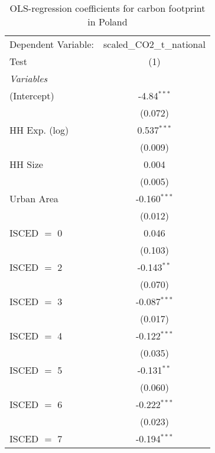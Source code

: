 
\begin{table}[htbp!]
   \centering
   \small
   \begin{adjustbox}{width = 1\textwidth, max height = 0.95\textheight, center}
      \begin{threeparttable}[b]
         \caption{\label{tab:OLS_2_POL} OLS-regression coefficients for carbon footprint in Poland}
         \begin{tabular}{lc}
            \tabularnewline \midrule \midrule
            Dependent Variable: & scaled\_CO2\_t\_national\\     
            Test                & (1)\\  
            \midrule
            \emph{Variables}\\
            (Intercept)         & -4.84$^{***}$\\   
                                & (0.072)\\   
            HH Exp. (log)       & 0.537$^{***}$\\   
                                & (0.009)\\   
            HH Size             & 0.004\\   
                                & (0.005)\\   
            Urban Area          & -0.160$^{***}$\\   
                                & (0.012)\\   
            ISCED $=$ 0         & 0.046\\   
                                & (0.103)\\   
            ISCED $=$ 2         & -0.143$^{**}$\\   
                                & (0.070)\\   
            ISCED $=$ 3         & -0.087$^{***}$\\   
                                & (0.017)\\   
            ISCED $=$ 4         & -0.122$^{***}$\\   
                                & (0.035)\\   
            ISCED $=$ 5         & -0.131$^{**}$\\   
                                & (0.060)\\   
            ISCED $=$ 6         & -0.222$^{***}$\\   
                                & (0.023)\\   
            ISCED $=$ 7         & -0.194$^{***}$\\   

\end{tabular}
\end{threeparttable}
\end{adjustbox}
\end{table}
